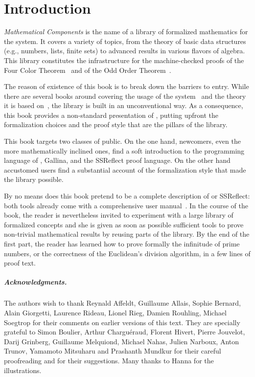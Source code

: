 \chapter*{Introduction}

\emph{Mathematical Components}
is the name of a library of formalized mathematics for the
\Coq{} system.  It covers a variety of
topics, from the theory of basic data structures (e.g., numbers, lists, finite
sets) to advanced results in various flavors of algebra. This library
constitutes the infrastructure for the machine-checked proofs of the
Four Color Theorem~\cite{Gonthier08} and of the
Odd Order Theorem~\cite{gonthier:hal-00816699}.

The reason of existence of this book is to break down the barriers to entry.
While there are several books around covering the usage of the
\Coq{} system~\cite{BC04,SF,CPDT}
and the theory it is based
on~\cite{Coq:manual}\cite{paulinmohring:hal-01094195,hottbook},
the \mcbMC{} library is built
in an unconventional way.  As a consequence, this book provides a
non-standard presentation of \Coq{}, putting upfront the formalization
choices and the proof style that are the pillars of the library.

This book targets two classes of public.  On the one hand, newcomers,
even the more mathematically inclined ones, %
find a soft
introduction to the programming
language of \Coq{}, Gallina, and the SSReflect proof language.
On the other hand accustomed \Coq{} users %
find a
substantial account of the formalization style that made the \mcbMC{}
library possible.


By no means does this book pretend to be a complete description of \Coq{} or
SSReflect: both tools already come with a comprehensive user
manual~\cite{Coq:manual,ssrman}.
In the course of the book, the reader is nevertheless invited to
experiment with  a large library of formalized concepts and she is
given as soon as possible sufficient tools to prove non-trivial
mathematical results by reusing parts of the library. By the end of
the first part, the reader has learned how to prove formally the
infinitude of prime numbers, or the correctness of the Euclidean's
division algorithm, in a few lines of proof text.

\paragraph{Acknowledgments.} The authors wish to thank
Reynald Affeldt, Guillaume Allais, Sophie Bernard, Alain Giorgetti,
Laurence Rideau, Lionel Rieg, Damien Rouhling, Michael Soegtrop for
their comments on earlier versions of this text. They are specially
grateful to Simon Boulier, Arthur Charguéraud, Florent Hivert, Pierre
Jouvelot, Darij Grinberg, Guillaume Melquiond, Michael Nahas, Julien
Narboux, Anton Trunov, Yamamoto Mitsuharu and Prashanth Mundkur for
their careful proofreading and for their suggestions. Many thanks to
Hanna for the illustrations.

